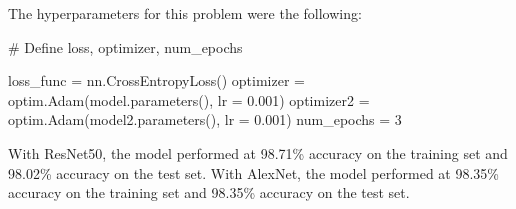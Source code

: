\documentclass{article}
\numberwithin{equation}{section}
\numberwithin{equation}{section}
\begin{document}
The hyperparameters for this problem were the following:

\begin{python}
# Define loss, optimizer, num_epochs

loss_func = nn.CrossEntropyLoss()   
optimizer = optim.Adam(model.parameters(), lr = 0.001)  
optimizer2 = optim.Adam(model2.parameters(), lr = 0.001)   
num_epochs = 3

\end{python}


With ResNet50, the model performed at 98.71\% accuracy on the training set and 98.02\% accuracy on the test set. With AlexNet, the model performed at 98.35\% accuracy on the training set and 98.35\% accuracy on the test set.







\begin{comment}
\begin{figure}
	\centering
	\hspace*{-3.0cm}
	\texttt{[image: Q4.2M.png]}
	\\	
	\textbf{Fig.7:} Comparator for 3-bit signed integers, $a=-2=[1,1,0]$
	\\
	\label{fig:Fig.7}
\end{figure}
\end{comment}
\end{document}
